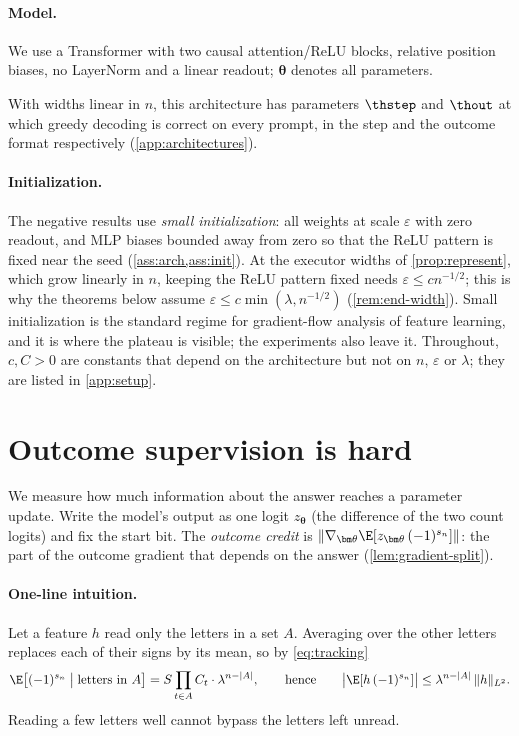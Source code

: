 \paragraph{Model.} We use a Transformer with two causal attention/ReLU blocks, relative position
biases, no LayerNorm and a linear readout; $\bm\theta$ denotes all parameters.

\begin{proposition}
\label{prop:represent}
With widths linear in $n$, this architecture has parameters $\thstep$ and $\thout$ at which greedy decoding
is correct on every prompt, in the step and the outcome format respectively (\cref{app:architectures}).
\end{proposition}

\paragraph{Initialization.} The negative results use \emph{small initialization}: all weights at scale
$\varepsilon$ with zero readout, and MLP biases bounded away from zero so that the ReLU pattern is fixed
near the seed (\cref{ass:arch,ass:init}). At the executor widths of \cref{prop:represent}, which grow linearly in $n$, keeping
the ReLU pattern fixed needs $\varepsilon\le cn^{-1/2}$; this is why the theorems below assume $\varepsilon\le c\min(\lambda,n^{-1/2})$
(\cref{rem:end-width}). Small initialization is the standard regime for gradient-flow
analysis of feature learning, and it is where the plateau is visible; the experiments also leave it.
Throughout, $c,C>0$ are constants that depend on the architecture but not on $n$, $\varepsilon$ or $\lambda$;
they are listed in \cref{app:setup}.

\section{Outcome supervision is hard}
\label{sec:outcome}
\label{sec:credit}

We measure how much information about the answer reaches a parameter update. Write the model's
output as one logit $z_{\bm\theta}$ (the difference of the two count logits) and fix the start bit.
The \emph{outcome credit} is $\|\nabla_{\bm\theta}\E[z_{\bm\theta}\,(-1)^{s_n}]\|$: the part of the outcome
gradient that depends on the answer (\cref{lem:gradient-split}).

\paragraph{One-line intuition.} Let a feature $h$ read only the letters in a set $A$. Averaging over the
other letters replaces each of their signs by its mean, so by \cref{eq:tracking}
\begin{equation}
 \E\bigl[(-1)^{s_n}\bigm| \text{letters in }A\bigr]=S\prod_{t\in A}C_t\cdot\lambda^{n-|A|},
 \qquad\text{hence}\qquad
 \bigl|\E[h\,(-1)^{s_n}]\bigr|\le\lambda^{n-|A|}\,\|h\|_{L^2}.
 \label{eq:credit-degree}
\end{equation}
Reading a few letters well cannot bypass the letters left unread.

